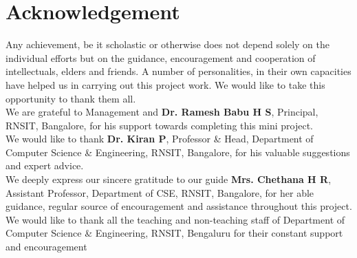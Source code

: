 \chapter*{Acknowledgement}%
%

Any achievement, be it scholastic or otherwise does not depend solely on the individual 
efforts but on the guidance, encouragement and cooperation of intellectuals, elders and 
friends. A number of personalities, in their own capacities have helped us in carrying out 
this project work. We would like to take this opportunity to thank them all.\\
We are grateful to Management and \textbf{Dr. Ramesh Babu H S}, Principal, RNSIT, Bangalore, for his 
support towards completing this mini project.\\
We would like to thank \textbf{Dr. Kiran P}, Professor \& Head, Department of Computer 
Science \& Engineering, RNSIT, Bangalore, for his valuable suggestions and expert advice.\\
We deeply express our sincere gratitude to our guide \textbf{Mrs. Chethana H R}, Assistant 
Professor, Department of CSE, RNSIT, Bangalore, for her able guidance, regular source of 
encouragement and assistance throughout this project. \\
We would like to thank all the teaching and non-teaching staff of Department of 
Computer Science \& Engineering, RNSIT, Bengaluru for their constant support and 
encouragement

\thispagestyle{plain}
